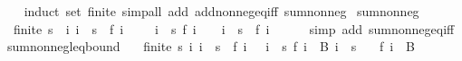 \begin{isabellebody}
%
\isadelimproof
\ \ %
\endisadelimproof
%
\isatagproof
{}\isamarkupfalse%
\ {\isacharparenleft}{\kern0pt}induct\ set{\isacharcolon}{\kern0pt}\ finite{\isacharparenright}{\kern0pt}\ {\isacharparenleft}{\kern0pt}simp{\isacharunderscore}{\kern0pt}all\ add{\isacharcolon}{\kern0pt}\ add{\isacharunderscore}{\kern0pt}nonneg{\isacharunderscore}{\kern0pt}eq{\isacharunderscore}{\kern0pt}{}{\isacharunderscore}{\kern0pt}iff\ sum{\isacharunderscore}{\kern0pt}nonneg{\isacharparenright}{\kern0pt}%
\endisatagproof
{\isafoldproof}%
%
\isadelimproof
\isanewline
%
\endisadelimproof
\isanewline
{}\isamarkupfalse%
\ sum{\isacharunderscore}{\kern0pt}nonneg{\isacharunderscore}{\kern0pt}{}{\isacharcolon}{\kern0pt}\isanewline
\ \ {\isachardoublequoteopen}finite\ s\ {\isasymLongrightarrow}\ {\isacharparenleft}{\kern0pt}{\isasymAnd}i{\isachardot}{\kern0pt}\ i\ {\isasymin}\ s\ {\isasymLongrightarrow}\ f\ i\ {\isasymge}\ {}{\isacharparenright}{\kern0pt}\ {\isasymLongrightarrow}\ {\isacharparenleft}{\kern0pt}{\isasymSum}\ i\ {\isasymin}\ s{\isachardot}{\kern0pt}\ f\ i{\isacharparenright}{\kern0pt}\ {\isacharequal}{\kern0pt}\ {}\ {\isasymLongrightarrow}\ i\ {\isasymin}\ s\ {\isasymLongrightarrow}\ f\ i\ {\isacharequal}{\kern0pt}\ {}{\isachardoublequoteclose}\isanewline
%
\isadelimproof
\ \ %
\endisadelimproof
%
\isatagproof
{}\isamarkupfalse%
\ {\isacharparenleft}{\kern0pt}simp\ add{\isacharcolon}{\kern0pt}\ sum{\isacharunderscore}{\kern0pt}nonneg{\isacharunderscore}{\kern0pt}eq{\isacharunderscore}{\kern0pt}{}{\isacharunderscore}{\kern0pt}iff{\isacharparenright}{\kern0pt}%
\endisatagproof
{\isafoldproof}%
%
\isadelimproof
\isanewline
%
\endisadelimproof
\isanewline
{}\isamarkupfalse%
\ sum{\isacharunderscore}{\kern0pt}nonneg{\isacharunderscore}{\kern0pt}leq{\isacharunderscore}{\kern0pt}bound{\isacharcolon}{\kern0pt}\isanewline
\ \ \ {\isachardoublequoteopen}finite\ s{\isachardoublequoteclose}\ {\isachardoublequoteopen}{\isasymAnd}i{\isachardot}{\kern0pt}\ i\ {\isasymin}\ s\ {\isasymLongrightarrow}\ f\ i\ {\isasymge}\ {}{\isachardoublequoteclose}\ {\isachardoublequoteopen}{\isacharparenleft}{\kern0pt}{\isasymSum}i\ {\isasymin}\ s{\isachardot}{\kern0pt}\ f\ i{\isacharparenright}{\kern0pt}\ {\isacharequal}{\kern0pt}\ B{\isachardoublequoteclose}\ {\isachardoublequoteopen}i\ {\isasymin}\ s{\isachardoublequoteclose}\isanewline
\ \ \ {\isachardoublequoteopen}f\ i\ {\isasymle}\ B{\isachardoublequoteclose}\isanewline

\end{isabellebody}
